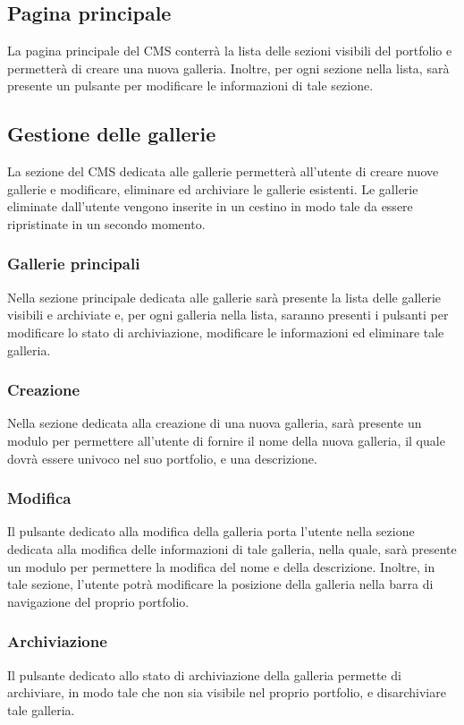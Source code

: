 \subsection{Pagina principale}
La pagina principale del CMS conterr\`a la lista delle sezioni visibili del portfolio e permetter\`a di creare una nuova galleria. Inoltre, per ogni sezione nella lista, sar\`a presente un pulsante per modificare le informazioni di tale sezione.

\subsection{Gestione delle gallerie}
La sezione del CMS dedicata alle gallerie permetter\`a all'utente di creare nuove gallerie e modificare, eliminare ed archiviare le gallerie esistenti. Le gallerie eliminate dall'utente vengono inserite in un cestino in modo tale da essere ripristinate in un secondo momento.

\subsubsection{Gallerie principali}
Nella sezione principale dedicata alle gallerie sar\`a presente la lista delle gallerie visibili e archiviate e, per ogni galleria nella lista, saranno presenti i pulsanti per modificare lo stato di archiviazione, modificare le informazioni ed eliminare tale galleria.

\subsubsection{Creazione}
Nella sezione dedicata alla creazione di una nuova galleria, sar\`a presente un modulo per permettere all'utente di fornire il nome della nuova galleria, il quale dovr\`a essere univoco nel suo portfolio, e una descrizione.

\subsubsection{Modifica}
Il pulsante dedicato alla modifica della galleria porta l'utente nella sezione dedicata alla modifica delle informazioni di tale galleria, nella quale, sar\`a presente un modulo per permettere la modifica del nome e della descrizione. Inoltre, in tale sezione, l'utente potr\`a modificare la posizione della galleria nella barra di navigazione del proprio portfolio.

\subsubsection{Archiviazione}
Il pulsante dedicato allo stato di archiviazione della galleria permette di archiviare, in modo tale che non sia visibile nel proprio portfolio, e disarchiviare tale galleria.

